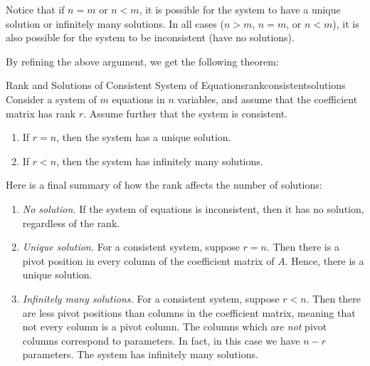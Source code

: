 Notice that if $n=m$ or $n<m$, it is possible for the system to have a
unique solution or infinitely many solutions. In all cases ($n>m$,
$n=m$, or $n<m$), it is also possible for the system to be
inconsistent (have no solutions).

By refining the above argument, we get the following theorem:

\begin{theorem}{Rank and Solutions of Consistent System of Equations}{rankconsistentsolutions}
  Consider a system of $m$ equations in $n$ variables, and assume that
  the coefficient matrix has rank $r$. Assume further that the system
  is consistent.
\begin{enumerate}
\item If $r=n$, then the system has a unique solution.
\item If $r<n$, then the system has infinitely many solutions.
\end{enumerate}
\end{theorem}

Here is a final summary of how the rank affects the number of
solutions:

\begin{enumerate}
\item {\em No solution.} If the system of equations is inconsistent,
  then it has no solution, regardless of the rank.

\item {\em Unique solution.} For a consistent system, suppose
  $r=n$. Then there is a pivot position in every column of the
  coefficient matrix of $A$. Hence, there is a unique solution.

\item {\em Infinitely many solutions.} For a consistent system, suppose
  $r<n$. Then there are less pivot positions than columns in the
  coefficient matrix, meaning that not every column is a pivot
  column. The columns which are {\em not} pivot columns correspond to
  parameters. In fact, in this case we have $n-r$ parameters. The
  system has infinitely many solutions.
\end{enumerate}
